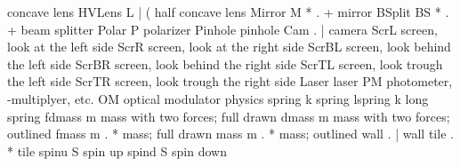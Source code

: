  {concave lens}
\cdefiv    HVLens   L   | (
 {half concave lens}
\cdefviii  Mirror   M   * . +
 {mirror}
\cdefviii  BSplit   BS  * . +
 {beam splitter}
\cdef      Polar    P  
 {polarizer}
\cdef      Pinhole  {} 
 {pinhole}
\cdefiv    Cam      {}   . |
 {camera}
\cdef      ScrL     {} 
 {screen, look at the left side}
\cdef      ScrR     {} 
 {screen, look at the right side}
\cdef      ScrBL    {} 
 {screen, look behind the left side}
\cdef      ScrBR    {} 
 {screen, look behind the right side}
\cdef      ScrTL    {} 
 {screen, look trough the left side}
\cdef      ScrTR    {} 
 {screen, look trough the right side}
\cdef      Laser    {} 
 {laser}
\cdef      PM       {} 
 {photometer, -multiplyer, etc.}
\bbdefNeTii  OM            {}
 {optical modulator}
\optionline physics
\cdef spring k 
 {spring}
\cdef lspring k 
 {long spring}
\cdef fdmass m 
 {mass with two forces; full drawn}
\cdef dmass m 
 {mass with two forces; outlined}
\cdefiv fmass m  . *
 {mass; full drawn}
\cdefiv mass m  . *
 {mass; outlined}
\cdefivNL wall  . |
 {wall}
\cdefivNL tile  . *
 {tile}
\cdef spinu S 
 {spin up}
\cdef spind S 
 {spin down}
\protectcirc
\endinput
